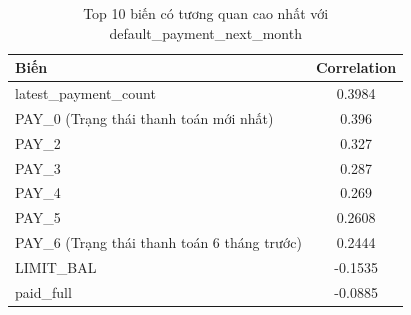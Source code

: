 \begin{table}[H]
    \centering
    \caption{Top 10 biến có tương quan cao nhất với default\_payment\_next\_month}
    \label{tab:top_corr}
    \begin{tabular}{|l|c|}
        \hline
        \rowcolor{Gray}
        \textbf{Biến} & \textbf{Correlation} \\ \hline
        latest\_payment\_count & 0.3984 \\ \hline
        PAY\_0 (Trạng thái thanh toán mới nhất) & 0.396 \\ \hline
        PAY\_2 & 0.327 \\ \hline
        PAY\_3 & 0.287 \\ \hline
        PAY\_4 & 0.269 \\ \hline
        PAY\_5 & 0.2608 \\ \hline
        PAY\_6 (Trạng thái thanh toán 6 tháng trước) & 0.2444 \\ \hline
        LIMIT\_BAL & -0.1535 \\ \hline
        paid\_full & -0.0885 \\ \hline
    \end{tabular}
\end{table}

